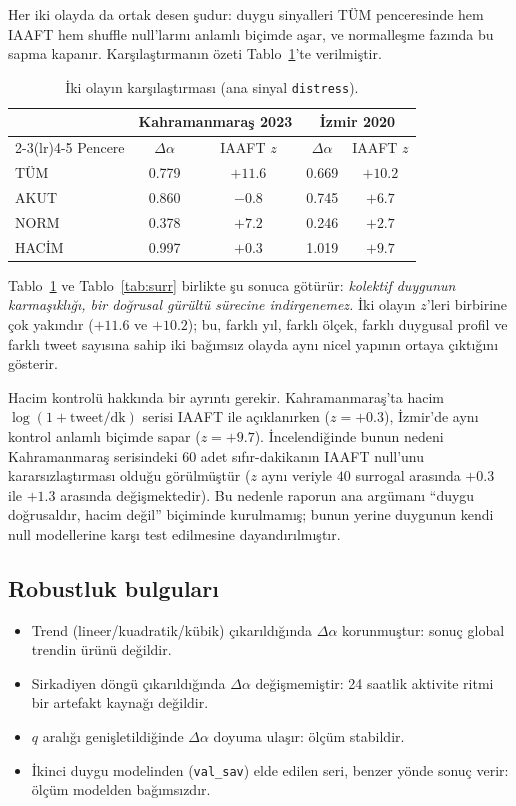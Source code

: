 \documentclass[11pt,a4paper]{article}
\newcommand{\Dal}{\Delta\alpha}
\begin{document}
Her iki olayda da ortak desen şudur: duygu sinyalleri TÜM penceresinde hem
IAAFT hem shuffle null'larını anlamlı biçimde aşar, ve normalleşme fazında bu
sapma kapanır. Karşılaştırmanın özeti Tablo~\ref{tab:kars}'te verilmiştir.

\begin{table}[H]
\centering
\small
\caption{İki olayın karşılaştırması (ana sinyal \texttt{distress}).}
\label{tab:kars}
\begin{tabular}{lcccc}
\toprule
& \multicolumn{2}{c}{Kahramanmaraş 2023} & \multicolumn{2}{c}{İzmir 2020}\\
\cmidrule(lr){2-3}\cmidrule(lr){4-5}
Pencere & $\Dal$ & IAAFT $z$ & $\Dal$ & IAAFT $z$\\
\midrule
TÜM  & 0.779 & $+11.6$ & 0.669 & $+10.2$\\
AKUT & 0.860 & $-0.8$  & 0.745 & $+6.7$\\
NORM & 0.378 & $+7.2$  & 0.246 & $+2.7$\\
HACİM& 0.997 & $+0.3$  & 1.019 & $+9.7$\\
\bottomrule
\end{tabular}
\end{table}

Tablo~\ref{tab:kars} ve Tablo~\ref{tab:surr} birlikte şu sonuca götürür:
\emph{kolektif duygunun karmaşıklığı, bir doğrusal gürültü sürecine
indirgenemez.} İki olayın $z$'leri birbirine çok yakındır ($+11.6$ ve $+10.2$);
bu, farklı yıl, farklı ölçek, farklı duygusal profil ve farklı tweet sayısına
sahip iki bağımsız olayda aynı nicel yapının ortaya çıktığını gösterir.

Hacim kontrolü hakkında bir ayrıntı gerekir. Kahramanmaraş'ta hacim
$\log(1+\text{tweet/dk})$ serisi IAAFT ile açıklanırken ($z=+0.3$), İzmir'de
aynı kontrol anlamlı biçimde sapar ($z=+9.7$). İncelendiğinde bunun nedeni
Kahramanmaraş serisindeki 60 adet sıfır-dakikanın IAAFT null'unu
kararsızlaştırması olduğu görülmüştür ($z$ aynı veriyle $40$ surrogal
arasında $+0.3$ ile $+1.3$ arasında değişmektedir). Bu nedenle raporun ana
argümanı ``duygu doğrusaldır, hacim değil'' biçiminde kurulmamış; bunun yerine
duygunun kendi null modellerine karşı test edilmesine dayandırılmıştır.

\subsection{Robustluk bulguları}

\begin{itemize}[leftmargin=1.4em]
  \item Trend (lineer/kuadratik/kübik) çıkarıldığında $\Dal$ korunmuştur:
        sonuç global trendin ürünü değildir.
  \item Sirkadiyen döngü çıkarıldığında $\Dal$ değişmemiştir: 24 saatlik
        aktivite ritmi bir artefakt kaynağı değildir.
  \item $q$ aralığı genişletildiğinde $\Dal$ doyuma ulaşır: ölçüm stabildir.
  \item İkinci duygu modelinden (\texttt{val\_sav}) elde edilen seri,
        benzer yönde sonuç verir: ölçüm modelden bağımsızdır.
\end{itemize}
\end{document}

